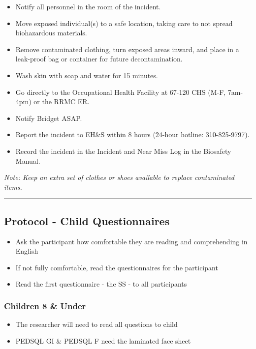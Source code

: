 \documentclass[]{book}
\providecommand{\tightlist}{%
  \setlength{\itemsep}{0pt}\setlength{\parskip}{0pt}}
\begin{document}
\begin{itemize}
\tightlist
\item
  Notify all personnel in the room of the incident.
\item
  Move exposed individual(s) to a safe location, taking care to not spread biohazardous materials.
\item
  Remove contaminated clothing, turn exposed areas inward, and place in a leak-proof bag or container for future decontamination.
\item
  Wash skin with soap and water for 15 minutes.
\item
  Go directly to the Occupational Health Facility at 67-120 CHS (M-F, 7am-4pm) or the RRMC ER.
\item
  Notify Bridget ASAP.
\item
  Report the incident to EH\&S within 8 hours (24-hour hotline: 310-825-9797).
\item
  Record the incident in the Incident and Near Miss Log in the Biosafety Manual.
\end{itemize}

\emph{Note: Keep an extra set of clothes or shoes available to replace contaminated items.}

\begin{center}\rule{0.5\linewidth}{0.5pt}\end{center}

\hypertarget{protocol---child-questionnaires}{%
\subsection{Protocol - Child Questionnaires}\label{protocol---child-questionnaires}}

\begin{itemize}
\tightlist
\item
  Ask the participant how comfortable they are reading and comprehending in English
\item
  If not fully comfortable, read the questionnaires for the participant
\item
  Read the first questionnaire - the SS - to all participants
\end{itemize}

\hypertarget{children-8-under}{%
\subsubsection{Children 8 \& Under}\label{children-8-under}}

\begin{itemize}
\tightlist
\item
  The researcher will need to read all questions to child
\item
  PEDSQL GI \& PEDSQL F need the laminated face sheet
\end{itemize}
\end{document}
